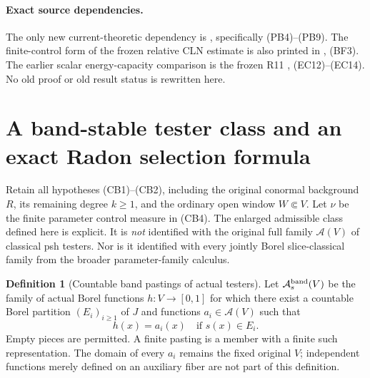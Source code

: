\documentclass[11pt,a4paper]{article}
\numberwithin{equation}{section}
\theoremstyle{definition}
\newtheorem{definition}[theorem]{Definition}
\theoremstyle{remark}
\begin{document}
\paragraph{Exact source dependencies.}
The only new current-theoretic dependency is
, specifically (PB4)--(PB9).
The finite-control form of the frozen relative CLN estimate is
also printed in , (BF3).
The earlier scalar energy-capacity comparison is the frozen R11
, (EC12)--(EC14).
No old proof or old result status is rewritten here.



\section{A band-stable tester class and an exact Radon selection formula}
\label{sec:r12-band-stable-capacity}

Retain all hypotheses (CB1)--(CB2), including the original
conormal background $R$, its remaining degree $k\geq1$, and
the ordinary open window $W\Subset V$. Let $\nu$ be the finite
parameter control measure in (CB4). The enlarged admissible class
defined here is explicit. It is \emph{not} identified with the
original full family $\mathcal A(V)$ of classical psh testers.
Nor is it identified with every jointly Borel slice-classical
family from the broader parameter-family calculus.

\begin{definition}[Countable band pastings of actual testers]
\label{def:r12-band-pasted-testers}
Let $\mathcal A_s^{\rm band}(V)$ be the family of actual Borel
functions $h:V\to[0,1]$ for which there exist a countable Borel
partition $(E_i)_{i\geq1}$ of $J$ and functions
$a_i\in\mathcal A(V)$ such that
\[
                         h(x)=a_i(x)\quad\text{if }s(x)\in E_i.
 \tag{BA1}
\]
Empty pieces are permitted. A finite pasting is a member with a
finite such representation. The domain of every $a_i$ remains
the fixed original $V$; independent functions merely defined on
an auxiliary fiber are not part of this definition.
\end{definition}
\end{document}
